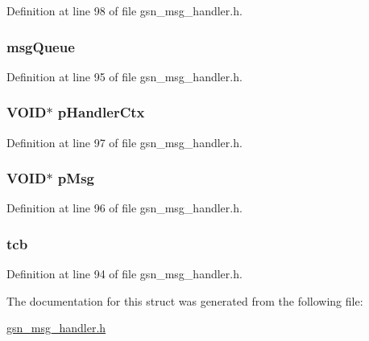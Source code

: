 Definition at line 98 of file gsn\_\-msg\_\-handler.h.

\hypertarget{a00155_a3525baeed8d9f795ed0c44437f548da2}{
\subsubsection[{msgQueue}]{ {\bf msgQueue}}}
\label{a00155_a3525baeed8d9f795ed0c44437f548da2}


Definition at line 95 of file gsn\_\-msg\_\-handler.h.

\hypertarget{a00155_a5d6d9da64bf90f43d0fb33529eefb8b4}{
\subsubsection[{pHandlerCtx}]{\setlength{\rightskip}{0pt plus 5cm}VOID$\ast$ {\bf pHandlerCtx}}}
\label{a00155_a5d6d9da64bf90f43d0fb33529eefb8b4}


Definition at line 97 of file gsn\_\-msg\_\-handler.h.

\hypertarget{a00155_a115621dd56e7c469fd9324a45ae055c0}{
\subsubsection[{pMsg}]{\setlength{\rightskip}{0pt plus 5cm}VOID$\ast$ {\bf pMsg}}}
\label{a00155_a115621dd56e7c469fd9324a45ae055c0}


Definition at line 96 of file gsn\_\-msg\_\-handler.h.

\hypertarget{a00155_afe071d7dcf0fdfb6314fefc4b6f663df}{
\subsubsection[{tcb}]{ {\bf tcb}}}
\label{a00155_afe071d7dcf0fdfb6314fefc4b6f663df}


Definition at line 94 of file gsn\_\-msg\_\-handler.h.



The documentation for this struct was generated from the following file:\begin{DoxyCompactItemize}
\item 
\hyperlink{a00528}{gsn\_\-msg\_\-handler.h}\end{DoxyCompactItemize}

